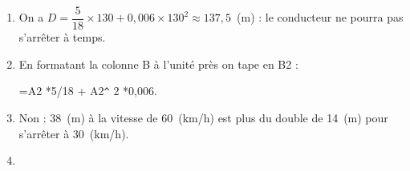 
\medskip

%
%

\begin{enumerate}
\item %
On a $D = \dfrac{5}{18} \times  130 + 0,006 \times  130^2 \approx 137,5$~(m) : le conducteur ne pourra pas s’arrêter à temps.
\item %


En formatant la colonne B à l’unité près on tape en B2 : 

=A2 *5/18 + A2\verb|^| 2  *0,006.
\item %
Non : 38~(m) à la vitesse de 60~(km/h) est plus du double de 14~(m) pour s’arrêter à 30~(km/h).
\item %
 

\end{enumerate}
